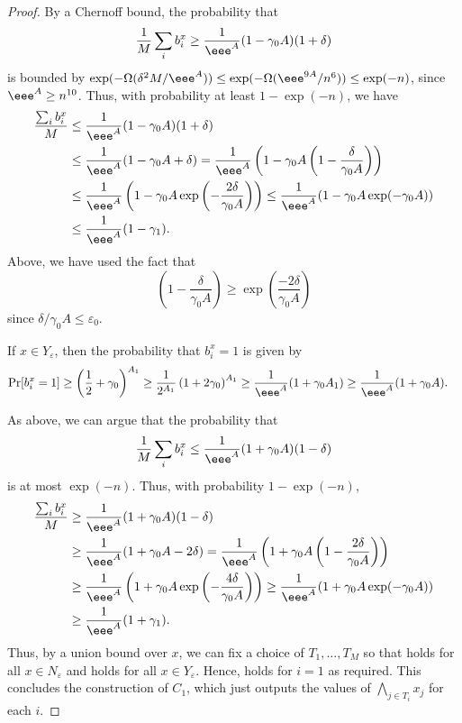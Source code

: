 \documentclass{toc}
\newcommand{\prob}[2]{\mathop{\mathrm{Pr}}_{#1}[#2]}
\begin{document}
\begin{proof}
By a Chernoff bound, the probability that
\[
  \frac{1}{M}\sum_i b_i^x\geq \frac{1}{\eee^A}(1-\gamma_0A)(1+\delta)
\]
is bounded by
$\exp(-\Omega(\delta^2M/\eee^A))\leq \exp(-\Omega(\eee^{9A}/n^6))\leq
\exp(-n)$, since $\eee^A \geq n^{10}$. Thus, with probability at least
$1-\exp(-n)$, we have
\begin{align}
\frac{\sum_i b_i^x}{M}&\leq \frac{1}{\eee^A}(1-\gamma_0A)(1+\delta)\notag\\
&\leq \frac{1}{\eee^A}(1-\gamma_0A + \delta) = \frac{1}{\eee^A}\left(1-\gamma_0A\left(1-\frac{\delta}{\gamma_0A}\right)\right)\notag\\
&\leq \frac{1}{\eee^A}\left(1-\gamma_0A\exp\left(-\frac{2\delta}{\gamma_0A}\right)\right)\leq \frac{1}{\eee^A}(1-\gamma_0A\exp(-\gamma_0A))\notag\\
&\leq \frac{1}{\eee^A}(1-\gamma_1).\label{eq:C1.1}
\end{align}
%
Above, we have used the fact that
\[
  \left(1-\frac{\delta}{\gamma_0A}\right)\geq \exp\left(\frac{-2\delta}{\gamma_0A}\right)
\]
since $\delta/\gamma_0A \leq \varepsilon_0$.

If $x\in Y_\varepsilon$, then the probability that $b_i^x = 1$ is given by 
\begin{align*}
\prob{}{b_i^x = 1} &\geq \left(\frac{1}{2}+ \gamma_0\right)^{A_1}
%
%
\geq \frac{1}{2^{A_1}} \left(1+2\gamma_0\right)^{A_1} 
\geq \frac{1}{\eee^A}(1+\gamma_0{A_1})
%
%
\geq \frac{1}{\eee^A}(1+\gamma_0A).
\end{align*}

As above, we can argue that the probability that
\[
  \frac{1}{M}\sum_i b_i^x \leq \frac{1}{\eee^A}(1+\gamma_0A)(1-\delta)
\]
is at most $\exp(-n)$. Thus, with probability $1-\exp(-n)$,
\begin{align}
\frac{\sum_i b_i^x}{M}&\geq \frac{1}{\eee^A}(1+\gamma_0A)(1-\delta)\notag\\
&\geq \frac{1}{\eee^A}(1+\gamma_0A -2\delta) = \frac{1}{\eee^A}\left(1+\gamma_0A\left(1-\frac{2\delta}{\gamma_0A}\right)\right)\notag\\
&\geq \frac{1}{\eee^A}\left(1+\gamma_0A\exp\left(-\frac{4\delta}{\gamma_0A}\right)\right)\geq \frac{1}{\eee^A}(1+\gamma_0A\exp(-\gamma_0A))\notag\\
&\geq \frac{1}{\eee^A}(1+\gamma_1).\label{eq:C1.2}
\end{align}
Thus, by a union bound over $x$, we can fix a choice of $T_1,\ldots,T_M$ so that  holds for all $x\in N_\varepsilon$ and  holds for all $x\in Y_\varepsilon$. Hence,  holds for $i=1$ as required. This concludes the construction of $C_1$, which just outputs the values of $\bigwedge_{j\in T_i}x_j$   for each $i$.
 

\end{proof}
\end{document}
